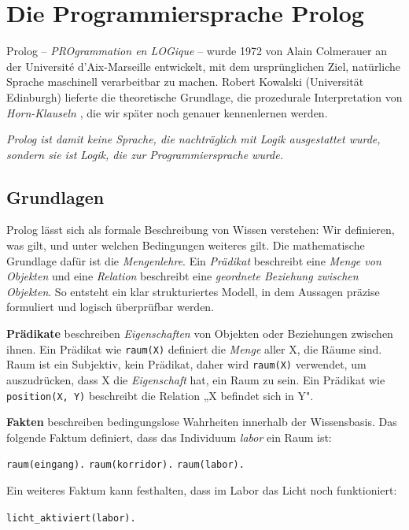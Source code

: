 \documentclass[parskip=half,a4paper,11pt]{scrreprt}
\begin{document}
\newpage
\section{Die Programmiersprache Prolog}

Prolog – \textit{PROgrammation en LOGique} – wurde 1972 von Alain Colmerauer an der Université d’Aix-Marseille entwickelt, mit dem ursprünglichen Ziel, natürliche Sprache maschinell verarbeitbar zu machen. Robert Kowalski (Universität Edinburgh) lieferte die theoretische Grundlage, die prozedurale Interpretation von \textit{Horn-Klauseln} \citep{Kowalski1974}, die wir später noch genauer kennenlernen werden.

\textit{Prolog ist damit keine Sprache, die nachträglich mit Logik ausgestattet wurde, sondern sie ist Logik, die zur Programmiersprache wurde.}

\subsection{Grundlagen}

Prolog lässt sich als formale Beschreibung von Wissen verstehen: Wir definieren, was gilt, und unter welchen Bedingungen weiteres gilt. Die mathematische Grundlage dafür ist die \textit{Mengenlehre}. Ein \textit{Prädikat }beschreibt eine \textit{Menge von Objekten} und eine \textit{Relation }beschreibt eine \textit{geordnete Beziehung zwischen Objekten}. So entsteht ein klar strukturiertes Modell, in dem Aussagen präzise formuliert und logisch überprüfbar werden.

\textbf{Prädikate} beschreiben \textit{Eigenschaften} von Objekten oder Beziehungen zwischen ihnen. Ein Prädikat wie \texttt{raum(X)} definiert die \textit{Menge} aller X, die Räume sind. Raum ist ein Subjektiv, kein Prädikat, daher wird \texttt{raum(X)} verwendet, um auszudrücken, dass X die \textit{Eigenschaft} hat, ein Raum zu sein. Ein Prädikat wie \texttt{position(X, Y)} beschreibt die Relation „X befindet sich in Y". 

\textbf{Fakten} beschreiben bedingungslose Wahrheiten innerhalb der Wissensbasis. Das folgende Faktum definiert, dass das Individuum \textit{labor} ein Raum ist:

\texttt{raum(eingang).}
\texttt{raum(korridor).}
\texttt{raum(labor).}

Ein weiteres Faktum kann festhalten, dass im Labor das Licht noch funktioniert:

\texttt{licht\_aktiviert(labor).}
\end{document}
